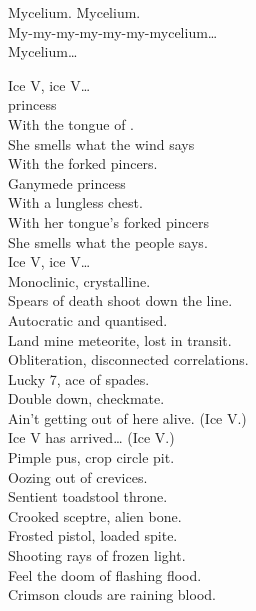 Mycelium. Mycelium. \\
My-my-my-my-my-my-mycelium… \\

Mycelium… \\





Ice V, ice V… \\

 princess \\
With the tongue of . \\
She smells what the wind says \\
With the  forked pincers. \\

Ganymede princess \\
With a lungless chest. \\
With her tongue's forked pincers \\
She smells what the people says. \\

Ice V, ice V… \\

Monoclinic, crystalline. \\
Spears of death shoot down the line. \\
Autocratic and quantised. \\
Land mine meteorite, lost in transit. \\
Obliteration, disconnected correlations. \\
Lucky 7, ace of spades. \\
Double down, checkmate. \\

Ain't getting out of here alive. (Ice V.) \\
Ice V has arrived… (Ice V.) \\

Pimple pus, crop circle pit. \\
Oozing out of crevices. \\
Sentient toadstool throne. \\
Crooked sceptre, alien bone. \\
Frosted pistol, loaded spite. \\
Shooting rays of frozen light. \\
Feel the doom of flashing flood. \\
Crimson clouds are raining blood. \\

